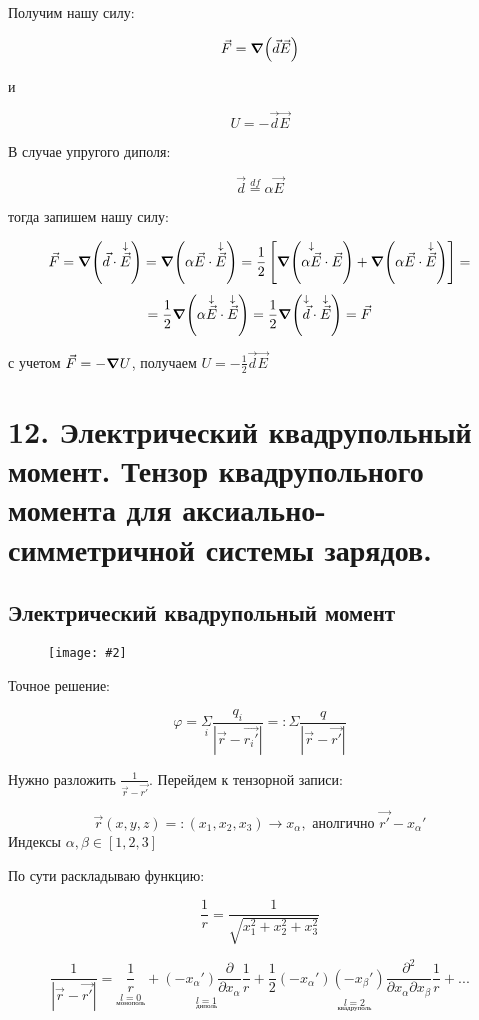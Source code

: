 \documentclass[a4paper,12pt]{article}
\newcommand{\fc}[1]{\[#1\]}
\newcommand{\imc}[2][0.7\textwidth]{%
    \begin{figure}[h!]
        \centering
        \texttt{[image: \#2]}
    \end{figure}%
}
\begin{document}
Получим нашу силу:

\fc{\vec{F}=\grad(\vec{d}\vec{E})}

и 

\fc{U=-\vec{d}\vec{E}}

В случае упругого диполя:

\fc{\vec{d}\overset{df}{=}\alpha\vec{E}}

тогда запишем нашу силу:

\fc{\vec{F}=\grad(\vec{d}\cdot\overset{\downarrow}{\vec{E}})=\grad(\alpha\vec{E}\cdot\overset{\downarrow}{\vec{E}})=\frac{1}{2}\left[\grad(\overset{\downarrow}{\alpha\vec{E}}\cdot \vec{E})+\grad(\alpha\vec{E}\cdot\overset{\downarrow}{\vec{E}})\right]=}
\fc{=\frac{1}{2}\grad(\alpha\overset{\downarrow}{\vec{E}}\cdot \overset{\downarrow}{\vec{E}})=\frac{1}{2}\grad(\overset{\downarrow}{\vec{d}}\cdot\overset{\downarrow}{\vec{E}})=\vec{F}}

с учетом $\vec{F}=-\grad U$, получаем $U=-\frac{1}{2}\vec{d}\vec{E}$

\newpage

\section*{12. Электрический квадрупольный момент. Тензор квадрупольного момента для аксиально-симметричной системы зарядов.}

\subsection*{Электрический квадрупольный момент}

\imc[0.45\textwidth]{21.png}

Точное решение:

\fc{\varphi=\underset{i}{\Sigma}\frac{q_i}{|\vec{r}-\vec{r_i'}|}=:\Sigma \frac{q}{|\vec{r}-\vec{r'}|}}

Нужно разложить $\frac{1}{\vec{r}-\vec{r'}}$. Перейдем к тензорной записи:

\fc{\vec{r}(x,y,z)=:(x_1,x_2,x_3)\rightarrow x_{\alpha}, \text{ анолгично }\vec{r'}-x_{\alpha}'}
Индексы $\alpha,\beta \in [1,2,3]$

По сути раскладываю функцию:

\fc{\frac{1}{r}=\frac{1}{\sqrt{x_1^2+x_2^2+x_3^2}}}

\fc{\frac{1}{|\vec{r}-\vec{r'}|}=\underset{\underset{\text{монополь}}{l=0}}{\frac{1}{r}}+\underset{\underset{\text{диполь}}{l=1}}{(-x_{\alpha}')\frac{\partial}{\partial x_{\alpha}}\frac{1}{r}}+\underset{\underset{\text{квадруполь}}{l=2}}{\frac{1}{2}(-x_{\alpha}')(-x_{\beta}')\frac{\partial^2}{\partial x_{\alpha}\partial x_{\beta}}\frac{1}{r}}+...}
\end{document}
